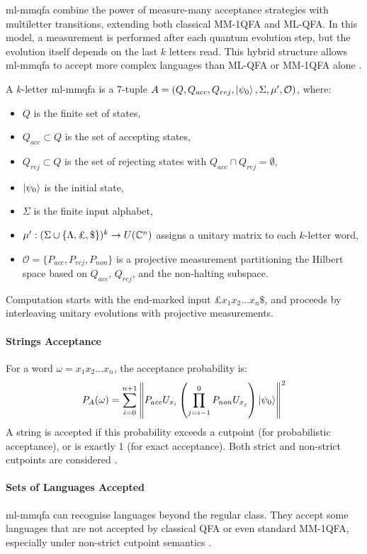 \gls{ml-mmqfa} combine the power of measure-many acceptance strategies with multiletter transitions, extending both classical MM-1QFA and ML-QFA. In this model, a measurement is performed after each quantum evolution step, but the evolution itself depends on the last $k$ letters read. This hybrid structure allows \gls{ml-mmqfa} to accept more complex languages than ML-QFA or MM-1QFA alone \cite{lin2012equivalence}.

\begin{definition}
A $k$-letter \gls{ml-mmqfa} is a 7-tuple $A = (Q, Q_{acc}, Q_{rej}, \ket{\psi_0}, \Sigma, \mu', \mathcal{O})$, where:
\begin{itemize}
    \item $Q$ is the finite set of states,
    \item $Q_{acc} \subset Q$ is the set of accepting states,
    \item $Q_{rej} \subset Q$ is the set of rejecting states with $Q_{acc} \cap Q_{rej} = \emptyset$,
    \item $\ket{\psi_0}$ is the initial state,
    \item $\Sigma$ is the finite input alphabet,
    \item $\mu': (\Sigma \cup \{\Lambda, \text{\textsterling}, \$\})^k \to U(\mathbb{C}^n)$ assigns a unitary matrix to each $k$-letter word,
    \item $\mathcal{O} = \{P_{acc}, P_{rej}, P_{non}\}$ is a projective measurement partitioning the Hilbert space based on $Q_{acc}$, $Q_{rej}$, and the non-halting subspace.
\end{itemize}
\end{definition}

Computation starts with the end-marked input £$x_1x_2 \dots x_n\$$, and proceeds by interleaving unitary evolutions with projective measurements.

\paragraph{Strings Acceptance}
For a word $\omega = x_1 x_2 \dots x_n$, the acceptance probability is:
\[
P_A(\omega) = \sum_{i=0}^{n+1} \left\| P_{acc} U_{x_i} \left( \prod_{j=i-1}^{0} P_{non} U_{x_j} \right) \ket{\psi_0} \right\|^2
\]
A string is accepted if this probability exceeds a cutpoint (for probabilistic acceptance), or is exactly 1 (for exact acceptance). Both strict and non-strict cutpoints are considered \cite{lin2012equivalence}.

\paragraph{Sets of Languages Accepted}
\gls{ml-mmqfa} can recognise languages beyond the regular class. They accept some languages that are not accepted by classical QFA or even standard MM-1QFA, especially under non-strict cutpoint semantics \cite{qiu2009hierarchy, lin2012equivalence}.

